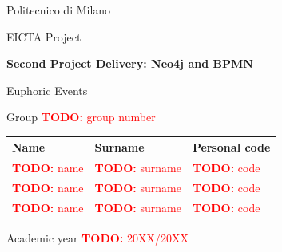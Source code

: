 \documentclass[11pt,a4paper]{report}
\newcommand{\todo}[1]{\textcolor{red}{\textbf{TODO:} #1}}
\begin{document}
\begin{titlepage}
  \centering
  {\Large Politecnico di Milano\par}
  \vspace{0.5cm}
  {\large EICTA \textendash{} Project\par}
  \vspace{2.5cm}
  {\Huge\bfseries Second Project Delivery: Neo4j and BPMN\par}
  \vspace{0.6cm}
  {\Large Euphoric Events\par}
  \vspace{2cm}
  {\large Group \todo{group number}\par}
  \vspace{1cm}
  \begin{tabular}{lll}
    \toprule
    Name & Surname & Personal code \\
    \midrule
    \todo{name} & \todo{surname} & \todo{code} \\
    \todo{name} & \todo{surname} & \todo{code} \\
    \todo{name} & \todo{surname} & \todo{code} \\
    \bottomrule
  \end{tabular}
  \vfill
  {\large Academic year \todo{20XX/20XX}\par}
\end{titlepage}

\tableofcontents






\end{document}
